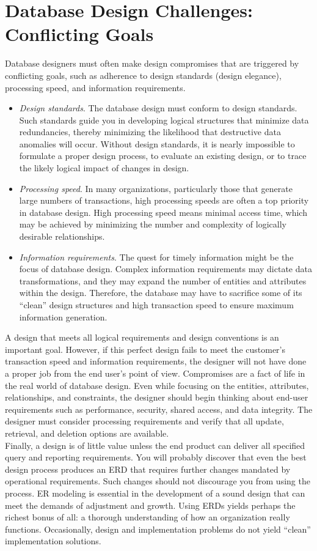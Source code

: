 \documentclass[a4paper, 12pt, titlepage]{report}
\begin{document}
{\section{Database Design Challenges: Conflicting Goals}
Database designers must often make design compromises that are triggered by conflicting goals, such as adherence to design standards (design elegance), processing speed,
and information requirements.
\begin{itemize}
\item \emph{Design standards}. The database design must conform to design standards. Such standards guide you in developing logical structures that minimize data redundancies,
thereby minimizing the likelihood that destructive data anomalies will occur. Without design standards, it is nearly impossible to formulate a proper design process, to evaluate an existing design, or to trace the likely logical impact of changes in design.
\item \emph{Processing speed}. In many organizations, particularly those that generate large numbers of transactions, high processing speeds are often a top priority in database
design. High processing speed means minimal access time, which may be achieved by minimizing the number and complexity of logically desirable relationships.
\item \emph{Information requirements}. The quest for timely information might be the focus of database design. Complex information requirements may dictate data transformations, and they may expand the number of entities and attributes within the design. Therefore, the database may have to sacrifice some of its “clean” design structures and
high transaction speed to ensure maximum information generation.
\end{itemize}
\noindent A design that meets all logical requirements and design conventions is an important goal. However, if this perfect design fails to meet the customer’s transaction speed and information requirements, the designer will not have done a proper job from the end user’s point of view. Compromises are a fact of life in the real world of database design.
Even while focusing on the entities, attributes, relationships, and constraints, the designer should begin thinking about end-user requirements such as performance, security, shared access, and data integrity. The designer must consider processing requirements and verify that all update, retrieval, and deletion options are available.\\
Finally, a design is of little value unless the end product can deliver all specified query and reporting requirements. You will probably discover that even the best design process produces an ERD that requires further changes mandated by operational requirements. Such changes should not discourage you from using the process. ER modeling is essential in the development of a sound design that can meet the demands of adjustment and growth. Using ERDs yields perhaps the richest bonus of all: a thorough understanding of how an organization really functions. Occasionally, design and implementation problems do not yield “clean” implementation solutions.\\\\
}
\end{document}

